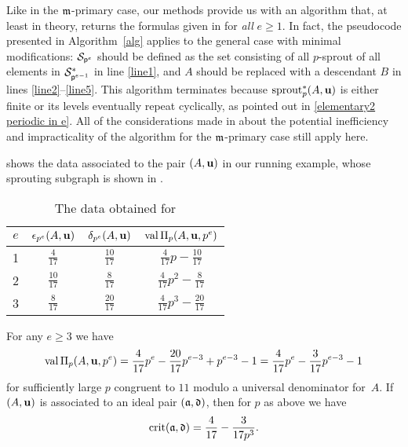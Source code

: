 \documentclass{amsart}
\begin{document}
\begin{remark}[An algorithm]
   \label{algorithm: R}
   Like in the $\mathfrak{m}$-primary case, our methods provide us with an algorithm that, at least in theory, returns the formulas given in  for \emph{all} $e \ge 1$.
   In fact, the pseudocode presented in Algorithm~\ref{alg} applies to the general case with minimal modifications:
   $\mathcal{S}_{\mathsf{p}^e}$ should be defined as the set consisting of all $p$-sprout of all elements in $\mathcal{S}^*_{\mathsf{p}^{e-1}}$ in line \ref{line1}, and $A$ should be replaced with a descendant $B$ in lines \ref{line2}--\ref{line5}.
   This algorithm terminates because $\operatorname{sprout}^*_p(A,\mathbf{u})$ is either finite or its levels eventually repeat cyclically, as pointed out in \eqref{elementary2 periodic in e}.
   All of the considerations made in  about the potential inefficiency and impracticality of the algorithm for the $\mathfrak{m}$-primary case still apply here.
\end{remark}

\begin{example}
   \label{ex: ft.5}
    shows the data associated to the pair $(A,\mathbf{u})$ in our running example, whose sprouting subgraph is shown in .
   \begin{table}
      \begin{center}
         \begingroup
         \setlength{\tabcolsep}{8pt} %
         \renewcommand{\arraystretch}{1.4} %
         \begin{tabular}{cccc}
           \toprule
           $e$ & $\epsilon_{p^e}(A,\mathbf{u})$ & $\delta_{p^e}(A,\mathbf{u})$ & $\operatorname{val}\Pi_p(A,\mathbf{u},p^e)$ \\
           \midrule
           1 & $\frac{4}{17}$ & $\frac{10}{17}$ & $\frac{4}{17}p - \frac{10}{17}$\\
           2 & $\frac{10}{17}$ & $\frac{8}{17}$ & $\frac{4}{17}p^2 - \frac{8}{17}$ \\
           3 & $\frac{8}{17}$ & $\frac{20}{17}$ & $\frac{4}{17}p^3 - \frac{20}{17}$\\
           \bottomrule
         \end{tabular}
         \endgroup
      \end{center}
      \caption{The data obtained for }
      \label{table: running example data}
   \end{table}
   For any $e \ge 3$ we have
   \[
      \operatorname{val}\Pi_p(A,\mathbf{u},p^e) = \frac{4}{17}p^e - \frac{20}{17}p^{e-3} + p^{e-3} - 1
       = \frac{4}{17}p^e - \frac{3}{17}p^{e-3}  - 1
    \]
    for sufficiently large $p$ congruent to $11$ modulo a universal denominator for~$A$.
    If $(A,\mathbf{u})$ is associated to an ideal pair $(\mathfrak{a},\mathfrak{d})$, then for $p$ as above we have
    \[\operatorname{crit}(\mathfrak{a},\mathfrak{d}) = \frac{4}{17} - \frac{3}{17p^3}.\]
\end{example}
\end{document}

